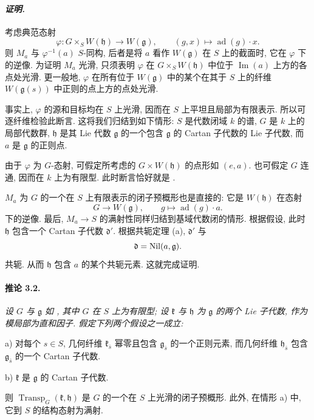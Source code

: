 \paragraph{\textit{证明.}}
考虑典范态射
\[
  \varphi\colon G\times_S W(\mathfrak h)\longrightarrow
  W(\mathfrak g),
  \qquad
  (g,x)\longmapsto\operatorname{ad}(g)\cdot x.
\]
则 \(M_a\) 与 \(\varphi^{-1}(a)\) \(S\)-同构, 后者是将 \(a\) 看作 \(W(\mathfrak g)\) 在 \(S\) 上的截面时, 它在 \(\varphi\) 下的逆像. 为证明 \(M_a\) 光滑, 只须表明 \(\varphi\) 在 \(G\times_S W(\mathfrak h)\) 中位于 \(\operatorname{Im}(a)\) 上方的各点处光滑. 更一般地, \(\varphi\) 在所有位于 \(W(\mathfrak g)\) 中的某个在其于 \(S\) 上的纤维 \(W(\mathfrak g(s))\) 中正则的点上方的点处光滑.

事实上, \(\varphi\) 的源和目标均在 \(S\) 上光滑, 因而在 \(S\) 上平坦且局部为有限表示. 所以可逐纤维检验此断言. 这将我们归结到如下情形: \(S\) 是代数闭域 \(k\) 的谱, \(G\) 是 \(k\) 上的局部代数群, \(\mathfrak h\) 是其 Lie 代数 \(\mathfrak g\) 的一个包含 \(\mathfrak g\) 的 Cartan 子代数的 Lie 子代数, 而 \(a\) 是 \(\mathfrak g\) 的正则点.

由于 \(\varphi\) 为 \(G\)-态射, 可假定所考虑的 \(G\times W(\mathfrak h)\) 的点形如 \((e,a)\). 也可假定 \(G\) 连通, 因而在 \(k\) 上为有限型. 此时断言恰好就是 .

\(M_a\) 为 \(G\) 的一个在 \(S\) 上有限表示的闭子预概形也是直接的: 它是 \(W(\mathfrak h)\) 在态射
\[
  G\longrightarrow W(\mathfrak g),
  \qquad
  g\longmapsto\operatorname{ad}(g)\cdot a.
\]
下的逆像. 最后, \(M_a\to S\) 的满射性同样归结到基域代数闭的情形. 根据假设, 此时 \(\mathfrak h\) 包含一个 Cartan 子代数 \(\mathfrak d'\). 根据共轭定理 \textup{(a)}, \(\mathfrak d'\) 与
\[
  \mathfrak d=\operatorname{Nil}(a,\mathfrak g).
\]
共轭. 从而 \(\mathfrak h\) 包含 \(a\) 的某个共轭元素. 这就完成证明.



\paragraph{\textbf{推论 3.2.}}
{\itshape 设 \(G\) 与 \(\mathfrak g\) 如 , 其中 \(G\) 在 \(S\) 上为有限型; 设 \(\mathfrak k\) 与 \(\mathfrak h\) 为 \(\mathfrak g\) 的两个 Lie 子代数, 作为模局部为直和因子. 假定下列两个假设之一成立:

\smallskip
\noindent
\textup{a)}
对每个 \(s\in S\), 几何纤维 \(\mathfrak k_{\bar s}\) 幂零且包含 \(\mathfrak g_{\bar s}\) 的一个正则元素, 而几何纤维 \(\mathfrak h_{\bar s}\) 包含 \(\mathfrak g_{\bar s}\) 的一个 Cartan 子代数.

\smallskip
\noindent
\textup{b)}
\(\mathfrak k\) 是 \(\mathfrak g\) 的 Cartan 子代数.

\smallskip
\noindent
则 \(\operatorname{Transp}_G(\mathfrak k,\mathfrak h)\) 是 \(G\) 的一个在 \(S\) 上光滑的闭子预概形. 此外, 在情形 a) 中, 它到 \(S\) 的结构态射为满射.}

